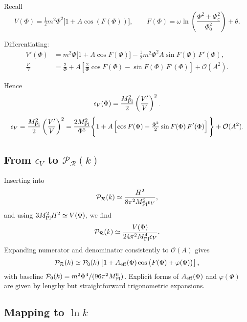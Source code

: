 \documentclass[reprint, amsmath, amssymb, aps, prd, nofootinbib]{revtex4-2}
\begin{document}
Recall
\begin{equation}
V(\Phi) = \tfrac{1}{2} m^2 \Phi^2 \Big[ 1 + A \cos(F(\Phi)) \Big],\qquad
F(\Phi) = \omega \ln\!\left(\frac{\Phi^2+\Phi_c^2}{\Phi_0^2}\right)+\theta.
\end{equation}

Differentiating:
\begin{align}
V'(\Phi) &= m^2 \Phi \Big[ 1 + A \cos F(\Phi)\Big]
 - \tfrac{1}{2} m^2 \Phi^2 A \sin F(\Phi)\,F'(\Phi),\\
\frac{V'}{V} &= \frac{2}{\Phi}
+ A\left[ \frac{2}{\Phi}\cos F(\Phi) - \sin F(\Phi)\,F'(\Phi)\right]
+ \mathcal{O}(A^2).
\end{align}

Hence
\begin{equation}
\epsilon_V(\Phi) = \frac{M_{\rm Pl}^2}{2}\left(\frac{V'}{V}\right)^2.
\end{equation}
\begin{equation}
\epsilon_V = \frac{M_{\rm Pl}^2}{2}\left(\frac{V'}{V}\right)^2
= \frac{2M_{\rm Pl}^2}{\Phi^2}\Bigg\{
1 + A\left[\cos F(\Phi) - \tfrac{\Phi^2}{2}\sin F(\Phi)\,F'(\Phi)\right]
\Bigg\} + \mathcal{O}(A^2).
\end{equation}

\subsection{From $\epsilon_V$ to $\mathcal{P}_\mathcal{R}(k)$}

Inserting into
\begin{equation}
\mathcal{P}_\mathcal{R}(k) \simeq \frac{H^2}{8\pi^2 M_{\rm Pl}^2 \epsilon_V},
\end{equation}
and using $3M_{\rm Pl}^2 H^2\simeq V(\Phi)$, we find
\begin{equation}
\mathcal{P}_\mathcal{R}(k) \simeq \frac{V(\Phi)}{24\pi^2 M_{\rm Pl}^4 \epsilon_V}.
\end{equation}
Expanding numerator and denominator consistently to $\mathcal{O}(A)$ gives
\begin{equation}
\mathcal{P}_\mathcal{R}(k) \simeq \mathcal{P}_0(k)\left[
1 + A_{\rm eff}(\Phi)\cos\big(F(\Phi)+\varphi(\Phi)\big)
\right],
\end{equation}
with baseline $\mathcal{P}_0(k) = m^2 \Phi^4 / (96 \pi^2 M_{\rm Pl}^6)$.  
Explicit forms of $A_{\rm eff}(\Phi)$ and $\varphi(\Phi)$ are given by
lengthy but straightforward trigonometric expansions.

\subsection{Mapping to $\ln k$}
\end{document}
